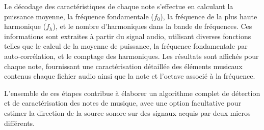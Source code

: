 Le décodage des caractéristiques de chaque note s'effectue en calculant la puissance moyenne, la fréquence fondamentale ($f_0$), la fréquence de la plus haute harmonique ($f_h$), et le nombre d'harmoniques dans la bande de fréquences. Ces informations sont extraites à partir du signal audio, utilisant diverses fonctions telles que le calcul de la moyenne de puissance, la fréquence fondamentale par auto-corrélation, et le comptage des harmoniques. Les résultats sont affichés pour chaque note, fournissant une caractérisation détaillée des éléments musicaux contenus chaque fichier audio ainsi que la note et l’octave associé à la fréquence. 

L'ensemble de ces étapes contribue à élaborer un algorithme complet de détection et de caractérisation des notes de musique, avec une option facultative pour estimer la direction de la source sonore sur des signaux acquis par deux micros différents. 